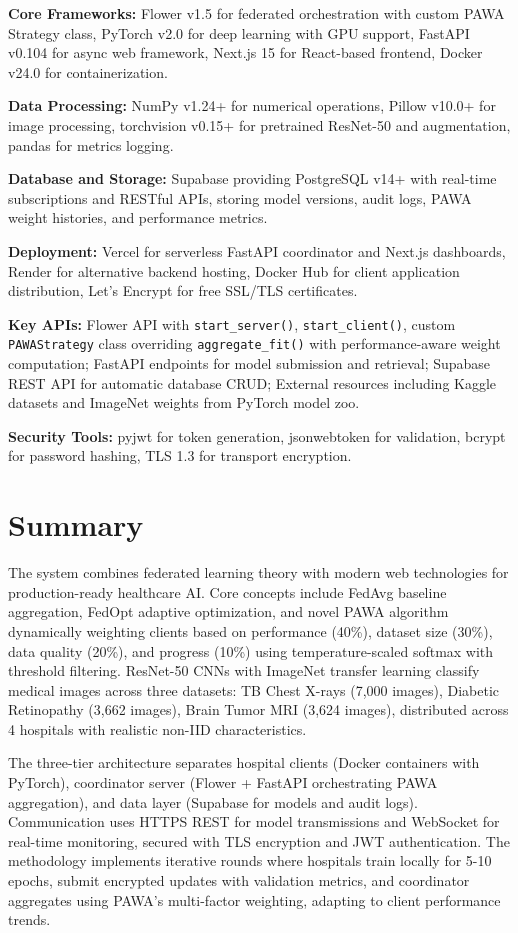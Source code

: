 \textbf{Core Frameworks:} Flower v1.5 for federated orchestration with custom PAWA Strategy class, PyTorch v2.0 for deep learning with GPU support, FastAPI v0.104 for async web framework, Next.js 15 for React-based frontend, Docker v24.0 for containerization.

\textbf{Data Processing:} NumPy v1.24+ for numerical operations, Pillow v10.0+ for image processing, torchvision v0.15+ for pretrained ResNet-50 and augmentation, pandas for metrics logging.

\textbf{Database and Storage:} Supabase providing PostgreSQL v14+ with real-time subscriptions and RESTful APIs, storing model versions, audit logs, PAWA weight histories, and performance metrics.

\textbf{Deployment:} Vercel for serverless FastAPI coordinator and Next.js dashboards, Render for alternative backend hosting, Docker Hub for client application distribution, Let's Encrypt for free SSL/TLS certificates.

\textbf{Key APIs:} Flower API with \texttt{start\_server()}, \texttt{start\_client()}, custom \texttt{PAWAStrategy} class overriding \texttt{aggregate\_fit()} with performance-aware weight computation; FastAPI endpoints for model submission and retrieval; Supabase REST API for automatic database CRUD; External resources including Kaggle datasets and ImageNet weights from PyTorch model zoo.

\textbf{Security Tools:} pyjwt for token generation, jsonwebtoken for validation, bcrypt for password hashing, TLS 1.3 for transport encryption.

\section{Summary}

The system combines federated learning theory with modern web technologies for production-ready healthcare AI. Core concepts include FedAvg baseline aggregation, FedOpt adaptive optimization, and novel PAWA algorithm dynamically weighting clients based on performance (40\%), dataset size (30\%), data quality (20\%), and progress (10\%) using temperature-scaled softmax with threshold filtering. ResNet-50 CNNs with ImageNet transfer learning classify medical images across three datasets: TB Chest X-rays (7,000 images), Diabetic Retinopathy (3,662 images), Brain Tumor MRI (3,624 images), distributed across 4 hospitals with realistic non-IID characteristics.

The three-tier architecture separates hospital clients (Docker containers with PyTorch), coordinator server (Flower + FastAPI orchestrating PAWA aggregation), and data layer (Supabase for models and audit logs). Communication uses HTTPS REST for model transmissions and WebSocket for real-time monitoring, secured with TLS encryption and JWT authentication. The methodology implements iterative rounds where hospitals train locally for 5-10 epochs, submit encrypted updates with validation metrics, and coordinator aggregates using PAWA's multi-factor weighting, adapting to client performance trends.


